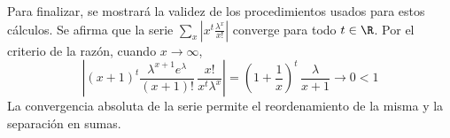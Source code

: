 \begin{Demo}
  Para finalizar, se mostrará la validez de los procedimientos usados para
  estos cálculos. Se afirma que la serie $\sum_x \left|x^t \frac{\lambda^x}{x!}\right|$
  converge para todo $t\in\R$. 
  Por el criterio de la razón, cuando $x\to\infty$,
  \[
    \left|(x+1)^t\frac{\lambda^{x+1}e^\lambda}{(x+1)!}\,
    \frac{x!}{x^t\lambda^x}\right|
    =
    \left(1 + \frac{1}{x}\right)^t\,\frac{\lambda}{x+1}
    \to 0 < 1
  \]
  La convergencia absoluta de la serie permite el reordenamiento de la misma y
  la separación en sumas.
\end{Demo}